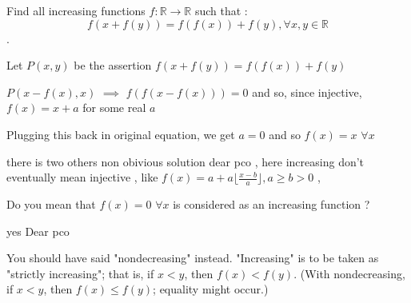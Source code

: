 \begin{solution}
	\begin{tcolorbox}Find all increasing functions $f: \mathbb{R} \to \mathbb{R}$ such that : 
\[ f(x+f(y))=f(f(x))+f(y)  , \forall x,y \in \mathbb{R} \] .\end{tcolorbox}
Let $P(x,y)$ be the assertion $f(x+f(y))=f(f(x))+f(y)$

$P(x-f(x),x)$ $\implies$ $f(f(x-f(x)))=0$ and so, since injective, $f(x)=x+a$ for some real $a$

Plugging this back in original equation, we get $a=0$ and so $\boxed{f(x)=x}$ $\forall x$
\end{solution}



\begin{solution}
	there is two others non obivious solution dear pco , here increasing don't eventually mean injective , like 
${f(x)=a+a\lfloor{\frac{x-b}{a}}\rfloor} , a\geq b>0 $ ,
\end{solution}



\begin{solution}
	Do you mean that $f(x)=0$ $\forall x$ is considered as an increasing function ?
\end{solution}



\begin{solution}
	yes Dear pco
\end{solution}



\begin{solution}
	You should have said "nondecreasing" instead. "Increasing" is to be taken as "strictly increasing"; that is, if $x < y$, then $f(x) < f(y)$. (With nondecreasing, if $x < y$, then $f(x) \le f(y)$; equality might occur.)
\end{solution}



